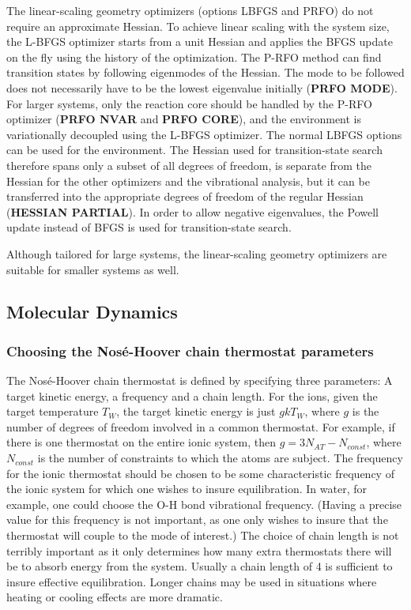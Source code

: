 \documentclass[twoside,10pt,titlepage,a4paper]{article}
\begin{document}
The linear-scaling geometry optimizers (options LBFGS and PRFO) do not require
an approximate Hessian. To achieve linear scaling with the system size, the
L-BFGS optimizer starts from a unit Hessian and applies the BFGS update on the
fly using the history of the optimization. The P-RFO method can find transition
states by following eigenmodes of the Hessian. The mode to be followed does not
necessarily have to be the lowest eigenvalue initially ({\bf PRFO MODE}). For
larger systems, only the reaction core should be handled by the P-RFO optimizer
({\bf PRFO NVAR} and {\bf PRFO CORE}), and the environment is variationally
decoupled using the L-BFGS optimizer. The normal LBFGS options can be used for
the environment. The Hessian used for transition-state search therefore spans
only a subset of all degrees of freedom, is separate from the Hessian for the
other optimizers and the vibrational analysis, but it can be transferred into
the appropriate degrees of freedom of the regular Hessian
({\bf HESSIAN PARTIAL}). In order to allow negative eigenvalues, the Powell
update instead of BFGS is used for transition-state search.

Although tailored for large systems, the linear-scaling geometry optimizers
are suitable for smaller systems as well.

\subsection{Molecular Dynamics}

\subsubsection{Choosing the Nos\'{e}-Hoover chain thermostat parameters}
\label{hints:nose}

  The Nos\'{e}-Hoover chain thermostat is defined by specifying three
parameters: A target kinetic energy, a frequency and a chain length. For the
ions, given the target temperature $T_W$, the target kinetic energy is just
$gkT_W$, where $g$ is the number of degrees of freedom involved in a common
thermostat. For example, if there is one thermostat on the entire ionic system,
then $g=3N_{AT}-N_{const}$, where $N_{const}$ is the number of constraints to
which the atoms are subject. The frequency for the ionic thermostat should be
chosen to be some characteristic frequency of the ionic system for which one
wishes to insure equilibration. In water, for example, one could choose the O-H
bond vibrational frequency. (Having a precise value for this frequency is not
important, as one only wishes to insure that the thermostat will couple to the
mode of interest.) The choice of chain length is not terribly important as it
only determines how many extra thermostats there will be to absorb energy from
the system. Usually a chain length of 4 is sufficient to insure effective
equilibration. Longer chains may be used in situations where heating or cooling
effects are more dramatic.
\end{document}
